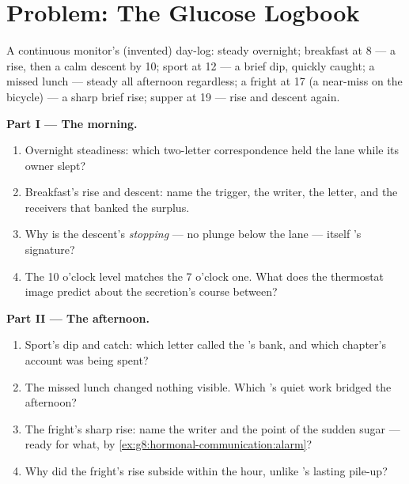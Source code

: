 \section{Problem: The Glucose Logbook}

\begin{problem}\label{pb:g8:hormonal-communication:1}
A continuous  monitor's (invented) day-log:
steady overnight; breakfast at 8 --- a rise, then a calm
descent by 10; sport at 12 --- a brief dip, quickly
caught; a missed lunch --- steady all afternoon
regardless; a fright at 17 (a near-miss on the bicycle)
--- a sharp brief rise; supper at 19 --- rise and
descent again.

\medskip\noindent\textbf{Part I --- The morning.}
\begin{enumerate}
  \item Overnight steadiness: which two-letter
        correspondence held the lane while its owner
        slept?
  \item Breakfast's rise and descent: name the trigger,
        the writer, the letter, and the receivers that
        banked the surplus.
  \item Why is the descent's \emph{stopping} --- no
        plunge below the lane --- itself 's
        signature?
  \item The 10 o'clock level matches the 7 o'clock one.
        What does the thermostat image predict about the
        secretion's course between?
\end{enumerate}

\medskip\noindent\textbf{Part II --- The afternoon.}
\begin{enumerate}[resume]
  \item Sport's dip and catch: which letter called the
        's bank, and which chapter's account was
        being spent?
  \item The missed lunch changed nothing visible. Which
        's quiet work bridged the
        afternoon?
  \item The fright's sharp rise: name the writer and
        the point of the sudden sugar --- ready for
        what, by
        \cref{ex:g8:hormonal-communication:alarm}?
  \item Why did the fright's rise subside within the
        hour, unlike 's lasting pile-up?
\end{enumerate}


\end{problem}
